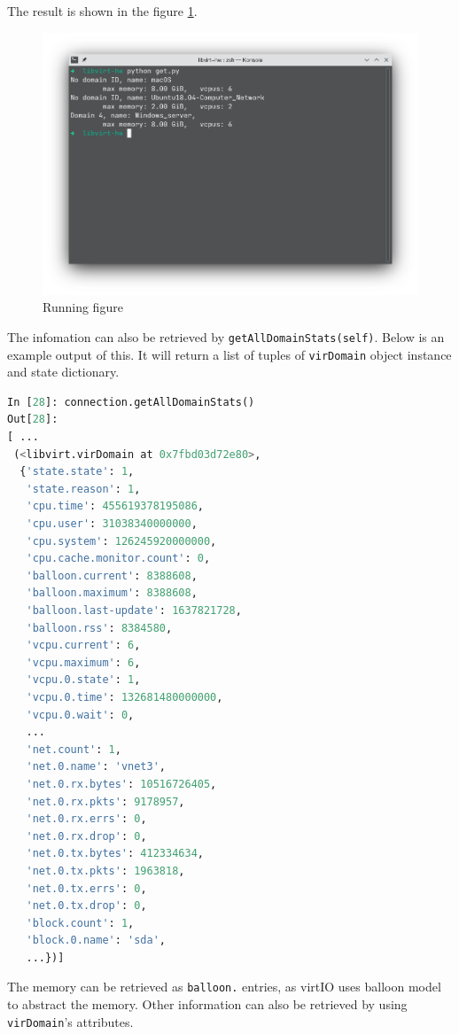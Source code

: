 \documentclass[12pt]{article}
\begin{document}
The result is shown in the figure \ref{fig:f}.

\begin{figure}[h]
    \centering
    \includegraphics[width=\textwidth]{fig1.png}
    \caption{Running figure}
    \label{fig:f}
\end{figure}

The infomation can also be retrieved by \texttt{getAllDomainStats(self)}. Below is an example output of this. It will return a list of tuples of \texttt{virDomain} object instance and state dictionary.

\begin{lstlisting}[language=python]
In [28]: connection.getAllDomainStats()
Out[28]: 
[ ...
 (<libvirt.virDomain at 0x7fbd03d72e80>,
  {'state.state': 1,
   'state.reason': 1,
   'cpu.time': 455619378195086,
   'cpu.user': 31038340000000,
   'cpu.system': 126245920000000,
   'cpu.cache.monitor.count': 0,
   'balloon.current': 8388608,
   'balloon.maximum': 8388608,
   'balloon.last-update': 1637821728,
   'balloon.rss': 8384580,
   'vcpu.current': 6,
   'vcpu.maximum': 6,
   'vcpu.0.state': 1,
   'vcpu.0.time': 132681480000000,
   'vcpu.0.wait': 0,
   ...
   'net.count': 1,
   'net.0.name': 'vnet3',
   'net.0.rx.bytes': 10516726405,
   'net.0.rx.pkts': 9178957,
   'net.0.rx.errs': 0,
   'net.0.rx.drop': 0,
   'net.0.tx.bytes': 412334634,
   'net.0.tx.pkts': 1963818,
   'net.0.tx.errs': 0,
   'net.0.tx.drop': 0,
   'block.count': 1,
   'block.0.name': 'sda',
   ...})]
\end{lstlisting}

The memory can be retrieved as \texttt{balloon.} entries, as virtIO uses balloon model to abstract the memory. Other information can also be retrieved by using \texttt{virDomain}'s attributes.
\end{document}
